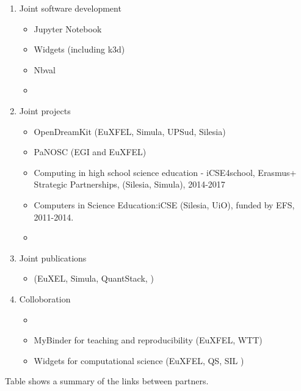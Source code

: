 \begin{enumerate}
\item Joint software development
  \begin{itemize}
  \item Jupyter Notebook 
  \item Widgets (including k3d)
  \item Nbval
  \item {}
  \end{itemize}

\item Joint projects
  \begin{itemize}
  \item OpenDreamKit (EuXFEL, Simula, UPSud, Silesia)
  \item PaNOSC (EGI and EuXFEL)
  \item Computing in high school science education - iCSE4school, Erasmus+ Strategic Partnerships, (Silesia, Simula), 2014-2017
  \item Computers in Science Education:iCSE (Silesia, UiO), funded by EFS, 2011-2014.
  \item {}
  \end{itemize}
\item Joint publications
  \begin{itemize}
  \item \cite{Kluyver2017} (EuXEL, Simula, QuantStack, )
  \end{itemize}

\item Colloboration
  \begin{itemize}
  \item {}

  \item MyBinder for teaching and reproducibility (EuXFEL, WTT)
  \item Widgets for computational science (EuXFEL, QS, SIL )
  \end{itemize}
\end{enumerate}

Table  shows a summary of the links
between partners.


